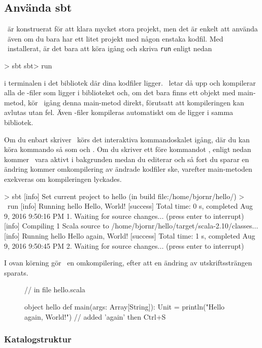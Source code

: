 \subsection{Använda sbt}
\sbt\ är konstruerat för att klara mycket stora projekt, men det är enkelt att använda \sbt\ även om du bara har ett litet projekt med någon enstaka kodfil. Med \sbt\ installerat, är det bara att köra igång \sbt och skriva \texttt{run} enligt nedan
\begin{REPLnonum}
> sbt
sbt> run
\end{REPLnonum}
i terminalen i det bibliotek där dina kodfiler ligger. \sbt\ letar då upp och kompilerar alla de -filer som ligger i biblioteket och, om det bara finns ett objekt med main-metod, kör \sbt\ igång denna main-metod direkt, förutsatt att kompileringen kan avlutas utan fel. Även -filer kompileras automatiskt om de ligger i samma bibliotek.

Om du enbart skriver \sbt\ körs det interaktiva kommandoskalet igång, där du kan köra kommando så som  och . Om du skriver ett \code{~} före kommandot , enligt nedan kommer \sbt\ vara aktivt i bakgrunden medan du editerar och så fort du sparar en ändring kommer omkompilering av ändrade kodfiler ske, varefter main-metoden exekveras om kompileringen lyckades.

\begin{REPLnonum}
> sbt
[info] Set current project to hello (in build file:/home/bjornr/hello/)
> ~run
[info] Running hello
Hello, World!
[success] Total time: 0 s, completed Aug 9, 2016 9:50:16 PM
1. Waiting for source changes... (press enter to interrupt)
[info] Compiling 1 Scala source to /home/bjornr/hello/target/scala-2.10/classes...
[info] Running hello
Hello again, World!
[success] Total time: 1 s, completed Aug 9, 2016 9:50:45 PM
2. Waiting for source changes... (press enter to interrupt)
\end{REPLnonum}

\noindent I ovan körning gör \sbt\ en omkompilering, efter att en ändring av utskriftssträngen sparats.
\begin{figure}[H]
\begin{Code}
// in file hello.scala

object hello {
  def main(args: Array[String]): Unit = {
    println("Hello again, World!") // added 'again' then Ctrl+S
  }
}
\end{Code}
\end{figure}

\subsubsection{Katalogstruktur}

